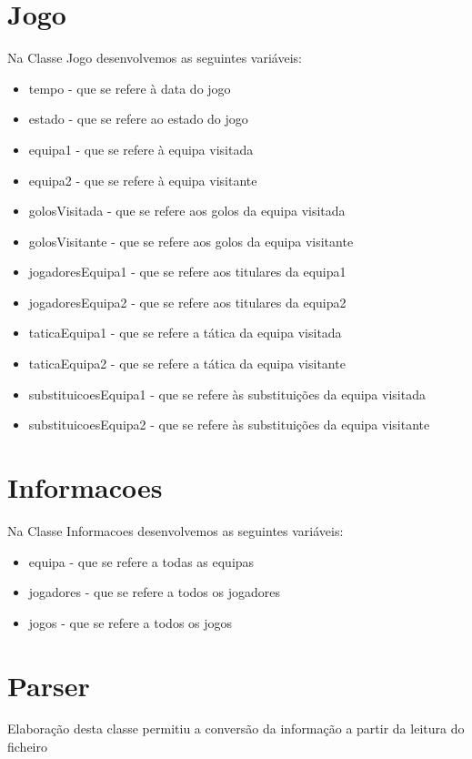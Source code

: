 \documentclass[a4paper,12pt]{article}
\begin{document}
\section{Jogo}
    Na Classe Jogo desenvolvemos as seguintes variáveis:
    \begin{itemize}
        \item tempo - que se refere à data do jogo
        \item estado - que se refere ao estado do jogo
        \item equipa1 - que se refere à equipa visitada
        \item equipa2 - que se refere à equipa visitante
        \item golosVisitada - que se refere aos golos da equipa visitada
        \item golosVisitante - que se refere aos golos da equipa visitante
        \item jogadoresEquipa1 - que se refere aos titulares da equipa1
        \item jogadoresEquipa2 - que se refere aos titulares da equipa2
        \item taticaEquipa1 - que se refere a tática da equipa visitada
        \item taticaEquipa2 - que se refere a tática da equipa visitante
        \item substituicoesEquipa1 - que se refere às substituições da equipa visitada
        \item substituicoesEquipa2 - que se refere às substituições da equipa visitante
    \end{itemize}

\section{Informacoes}
    Na Classe Informacoes desenvolvemos as seguintes variáveis:
    \begin{itemize}
        \item equipa - que se refere a todas as equipas
        \item jogadores - que se refere a todos os jogadores
        \item jogos - que se refere a todos os jogos
    \end{itemize}


\section{Parser}
    Elaboração desta classe permitiu a conversão da informação a partir da leitura do ficheiro
\end{document}
